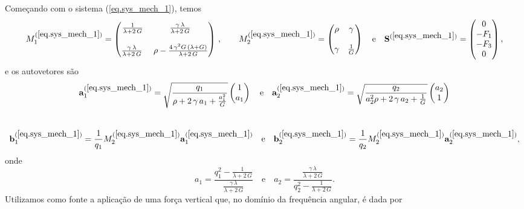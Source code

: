 Come\c{c}ando com o sistema (\ref{eq.sys_mech_1}), temos
\begin{equation*}
M_1^{(\ref{eq.sys_mech_1})}=\begin{pmatrix}
\frac{1}{\lambda+2\,G}&\frac{\gamma\,\lambda}{\lambda+2\,G}\\\\
\frac{\gamma\,\lambda}{\lambda+2\,G}\,&\,\rho-\frac{4\,\gamma^2G\,(\lambda+G)}{\lambda+2\,G}
\end{pmatrix}\,,\quad\quad
M_2^{(\ref{eq.sys_mech_1})}=\begin{pmatrix}
\rho&\gamma\\\\
\gamma&\frac{1}{G}
\end{pmatrix}\quad\text{e}\quad
\mathbf{S}^{(\ref{eq.sys_mech_1})}=\begin{pmatrix}
0\\-F_1\\-F_3\\0
\end{pmatrix},
\end{equation*}
e os autovetores s\~ao
\begin{equation*}
\mathbf{a}_1^{(\ref{eq.sys_mech_1})}=
\sqrt{\frac{q_1}{ \rho+2\,\gamma\,a_1+\frac{a_1^2}{G}}}
\begin{pmatrix}
1\\
a_1
\end{pmatrix}\quad\text{e}\quad
\mathbf{a}_2^{(\ref{eq.sys_mech_1})}=
\sqrt{\frac{q_2}{a_2^2\rho+2\,\gamma\,a_2+\frac{1}{G}}}
\begin{pmatrix}
a_2\\
1
\end{pmatrix}
\end{equation*}\\
\begin{equation*}
\mathbf{b}_1^{(\ref{eq.sys_mech_1})}=\frac{1}{q_1}M_2^{(\ref{eq.sys_mech_1})}\mathbf{a}_1^{(\ref{eq.sys_mech_1})}
\quad\text{e}\quad
\mathbf{b}_2^{(\ref{eq.sys_mech_1})}=\frac{1}{q_2}M_2^{(\ref{eq.sys_mech_1})}\mathbf{a}_2^{(\ref{eq.sys_mech_1})},
\end{equation*}
onde
\begin{equation*}
a_1=\frac{q_1^2- \frac{1}{\lambda+2\,G}  }{\frac{\gamma\,\lambda}{\lambda+2\,G}}\quad\text{e}\quad
a_2=\frac{\frac{\gamma\,\lambda}{\lambda+2\,G}}{q_2^2- \frac{1}{\lambda+2\,G}}.
\end{equation*}
Utilizamos como fonte a aplica\c{c}\~ao de uma for\c{c}a vertical que, no dom\'inio da frequ\^encia angular, \'e dada por
